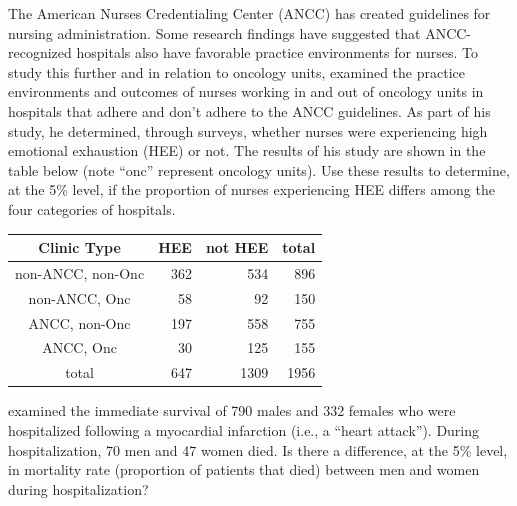 \documentclass[10pt,openany]{book}\usepackage[]{graphicx}\usepackage[]{color}
\begin{document}
\begin{exsection}
  \item \label{revex:ChiNurse} The American Nurses Credentialing Center (ANCC) has created guidelines for nursing administration.  Some research findings have suggested that ANCC-recognized hospitals also have favorable practice environments for nurses.  To study this further and in relation to oncology units, \cite{Friese2005} examined the practice environments and outcomes of nurses working in and out of oncology units in hospitals that adhere and don't adhere to the ANCC guidelines.  As part of his study, he determined, through surveys, whether nurses were experiencing high emotional exhaustion (HEE) or not.  The results of his study are shown in the table below (note ``onc'' represent oncology units).  Use these results to determine, at the 5\% level, if the proportion of nurses experiencing HEE differs among the four categories of hospitals. 
  \begin{center}
    \begin{tabular}{c|rr|r}
      \hline\hline
      Clinic Type & \multicolumn{1}{c}{HEE} & \multicolumn{1}{c|}{not HEE} & \multicolumn{1}{c}{total} \\
      \hline
      non-ANCC, non-Onc & 362 & 534 & 896 \\
      non-ANCC, Onc     & 58  & 92  & 150 \\
      ANCC, non-Onc     & 197 & 558 & 755 \\
      ANCC, Onc         & 30  & 125 & 155 \\
      \hline
      total & 647 & 1309 & 1956 \\
      \hline\hline
    \end{tabular}
  \end{center}

  \item \label{revex:ChiMI} \cite{Fiebachetal1990} examined the immediate survival of 790 males and 332 females who were hospitalized following a myocardial infarction (i.e., a ``heart attack'').  During hospitalization, 70 men and 47 women died.  Is there a difference, at the 5\% level, in mortality rate (proportion of patients that died) between men and women during hospitalization? 


\end{exsection}
\end{document}
